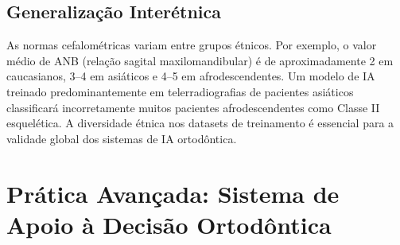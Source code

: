 
\subsection{Generalização Interétnica}

As normas cefalométricas variam entre grupos étnicos. Por exemplo, o valor médio de ANB (relação sagital maxilomandibular) é de aproximadamente 2\textdegree{} em caucasianos, 3--4\textdegree{} em asiáticos e 4--5\textdegree{} em afrodescendentes. Um modelo de IA treinado predominantemente em telerradiografias de pacientes asiáticos classificará incorretamente muitos pacientes afrodescendentes como Classe II esquelética. A diversidade étnica nos datasets de treinamento é essencial para a validade global dos sistemas de IA ortodôntica.

\section{Prática Avançada: Sistema de Apoio à Decisão Ortodôntica}

